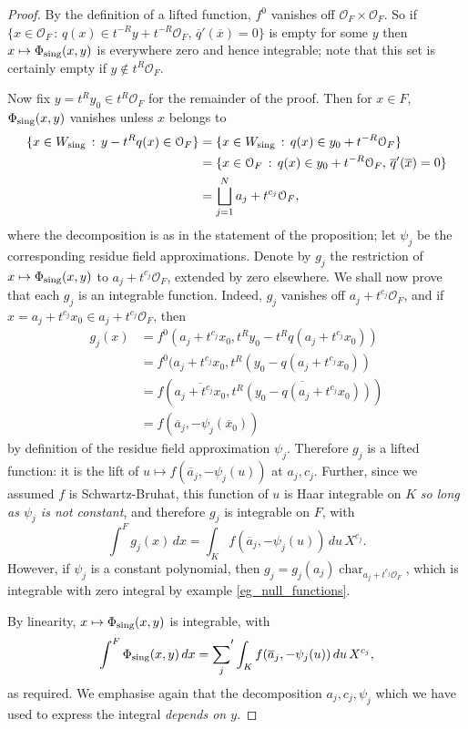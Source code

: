 \documentclass{lmsMODIFIED}
\newcommand{\roi}{\mathcal{O}}
\newcommand{\res}[1]{\overline{#1}}
\newcommand{\sub}[1]{{\mbox{\scriptsize {#1}}}}
\DeclareMathOperator{\Char}{char}
\begin{document}
\begin{proof}
By the definition of a lifted function, $f^0$ vanishes off $\roi_{F}\times\roi_{F}$. So if $\{x\in\roi_{F}\,:\,q(x)\in t^{-R}y+t^{-R}\roi_{F},\,\res{q}'(\res{x})=0\}$ is empty for some $y$ then $x\mapsto\Phi_\sub{sing}(x,y)$ is everywhere zero and hence integrable; note that this set is certainly empty if $y\notin t^R\roi_{F}$.

Now fix $y=t^Ry_0\in t^R\roi_{F}$ for the remainder of the proof. Then for $x\in F$, $\Phi_\sub{sing}(x,y)$ vanishes unless $x$ belongs to
\begin{align*}
\{x\in W_\sub{sing}\,:\,y-t^Rq(x)\in\roi_{F}\}
	&=\{x\in W_\sub{sing}\,:\,q(x)\in y_0+t^{-R}\roi_{F}\}\\
	&=\{x\in\roi_{F}\,:\,q(x)\in y_0+t^{-R}\roi_{F},\,\res{q}'(\res{x})=0\}\\
	&=\bigsqcup_{j=1}^N a_j+t^{c_j}\roi_{F},
\end{align*}
where the decomposition is as in the statement of the proposition; let $\psi_j$ be the corresponding residue field approximations. Denote by $g_j$ the restriction of $x\mapsto\Phi_\sub{sing}(x,y)$ to $a_j+t^{c_j}\roi_{F}$, extended by zero elsewhere. We shall now prove that each $g_j$ is an integrable function. Indeed, $g_j$ vanishes off $a_j+t^{c_j}\roi_{F}$, and if $x=a_j+t^{c_j}x_0\in a_j+t^{c_j}\roi_{F}$, then
\begin{align*}
g_j(x)&=f^0(a_j+t^{c_j}x_0, t^Ry_0-t^Rq(a_j+t^{c_j}x_0))\\
	&=f^0(a_j+t^{c_j}x_0,t^R(y_0-q(a_j+t^{c_j}x_0))\\
	&=f(\res{a_j+t^{c_j}x_0},\res{t^R(y_0-q(a_j+t^{c_j}x_0))})\\
	&=f(\res{a}_j,-\psi_j(\res{x}_0))
\end{align*}
by definition of the residue field approximation $\psi_j$. Therefore $g_j$ is a lifted function: it is the lift of $u\mapsto f(\res{a}_j,-\psi_j(u))$ at $a_j,c_j$. Further, since we assumed $f$ is Schwartz-Bruhat, this function of $u$ is Haar integrable on $K$ \emph{so long as $\psi_j$ is not constant}, and therefore $g_j$ is integrable on $F$, with \[\int^F g_j(x)\,dx=\int_K f(\res{a}_j,-\psi_j(u))\,du\,X^{c_j}.\] However, if $\psi_j$ is a constant polynomial, then $g_j=g_j(a_j)\Char_{a_j+t^{c_j}\roi_{F}}$, which is integrable with zero integral by example \ref{eg_null_functions}.

By linearity, $x\mapsto\Phi_\sub{sing}(x,y)$ is integrable, with \[\int^F\Phi_\sub{sing}(x,y)\,dx={\sum_j^{}}' \int_K f(\res{a}_j,-\psi_j(u))\,du\,X^{c_j},\] as required. We emphasise again that the decomposition $a_j,c_j,\psi_j$ which we have used to express the integral \emph{depends on $y$}.
\end{proof}
\end{document}
